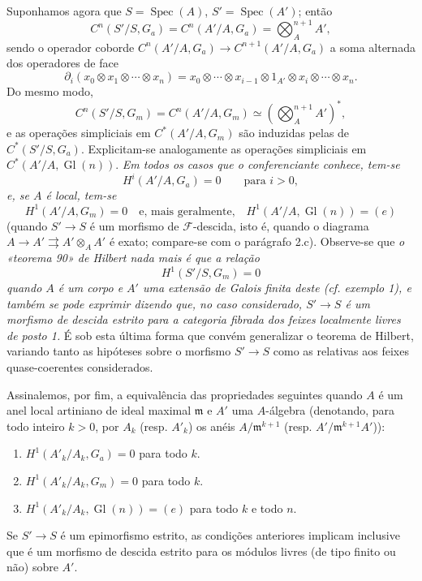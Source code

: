 Suponhamos agora que $S=\operatorname{Spec}(A)$,
$S'=\operatorname{Spec}(A')$; então
\[
  C^n(S'/S,G_a)=C^n(A'/A,G_a)=\bigotimes_A^{n+1}A',
\]
sendo o operador coborde
$C^n(A'/A,G_a)\longrightarrow C^{n+1}(A'/A,G_a)$ a soma alternada dos
operadores de face
\[
  \partial_i(x_0\otimes x_1\otimes\cdots\otimes x_n)
  =x_0\otimes\cdots\otimes x_{i-1}\otimes1_{A'}\otimes
   x_i\otimes\cdots\otimes x_n.
\]
Do mesmo modo,
\[
  C^n(S'/S,G_m)=C^n(A'/A,G_m)
  \simeq\left(\bigotimes_A^{n+1}A'\right)^*,
\]
e as operações simpliciais em $C^*(A'/A,G_m)$ são induzidas pelas de
$C^*(S'/S,G_a)$. Explicitam-se analogamente as operações simpliciais em
$C^*(A'/A,\operatorname{Gl}(n))$. \emph{Em todos os casos que o
conferenciante conhece, tem-se}
\[
  H^i(A'/A,G_a)=0\qquad\text{para $i>0$},
\]
\emph{e, se $A$ é local, tem-se}
\[
  H^1(A'/A,G_m)=0
  \quad\text{e, mais geralmente,}\quad
  H^1(A'/A,\operatorname{Gl}(n))=(e)
\]
(quando $S'\longrightarrow S$ é um morfismo de $\mathcal F$-descida,
isto é, quando o diagrama
$A\longrightarrow A'\rightrightarrows A'\otimes_AA'$ é exato; compare-se com
o parágrafo 2.c). Observe-se que \emph{o «teorema 90» de Hilbert nada mais é
que a relação}
\[
  H^1(S'/S,G_m)=0
\]
\emph{quando $A$ é um corpo e $A'$ uma extensão de Galois finita deste
(cf. exemplo 1), e também se pode exprimir dizendo que, no caso
considerado, $S'\longrightarrow S$ é um morfismo de descida estrito para a
categoria fibrada dos feixes localmente livres de posto 1.} É sob esta
última forma que convém generalizar o teorema de Hilbert, variando tanto
as hipóteses sobre o morfismo $S'\longrightarrow S$ como as relativas aos
feixes quase-coerentes considerados.

Assinalemos, por fim, a equivalência das propriedades seguintes quando
$A$ é um anel local artiniano de ideal maximal $\mathfrak m$ e $A'$ uma
$A$-álgebra (denotando, para todo inteiro $k>0$, por $A_k$ (resp. $A'_k$) os
anéis $A/\mathfrak m^{k+1}$ (resp. $A'/\mathfrak m^{k+1}A'$)):
\begin{enumerate}
\item[(i)] $H^1(A'_k/A_k,G_a)=0$ para todo $k$.
\item[(ii)] $H^1(A'_k/A_k,G_m)=0$ para todo $k$.
\item[(iii)] $H^1(A'_k/A_k,\operatorname{Gl}(n))=(e)$ para todo $k$ e todo
$n$.
\end{enumerate}
Se $S'\longrightarrow S$ é um epimorfismo estrito, as condições
anteriores implicam inclusive que é um morfismo de descida estrito para os
módulos livres (de tipo finito ou não) sobre $A'$.

